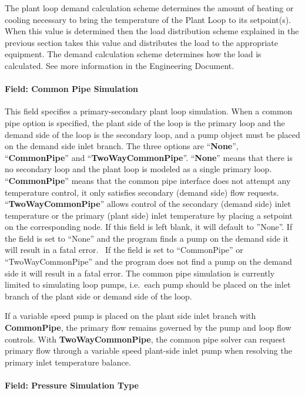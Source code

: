 The plant loop demand calculation scheme determines the amount of heating or cooling necessary to bring the temperature of the Plant Loop to its setpoint(s). When this value is determined then the load distribution scheme explained in the previous section takes this value and distributes the load to the appropriate equipment. The demand calculation scheme determines how the load is calculated. See more information in the Engineering Document.

\paragraph{Field: Common Pipe Simulation}\label{field-common-pipe-simulation}

This field specifies a primary-secondary plant loop simulation. When a common pipe option is specified, the plant side of the loop is the primary loop and the demand side of the loop is the secondary loop, and a pump object must be placed on the demand side inlet branch. The three options are ``\textbf{None}'', ``\textbf{CommonPipe}'' and ``\textbf{TwoWayCommonPipe}''. ``\textbf{None}'' means that there is no secondary loop and the plant loop is modeled as a single primary loop. ``\textbf{CommonPipe}'' means that the common pipe interface does not attempt any temperature control, it only satisfies secondary (demand side) flow requests. ``\textbf{TwoWayCommonPipe}'' allows control of the secondary (demand side) inlet temperature or the primary (plant side) inlet temperature by placing a setpoint on the corresponding node. If this field is left blank, it will default to ''None''. If the field is set to ``None'' and the program finds a pump on the demand side it will result in a fatal error.~ If the field is set to ``CommonPipe'' or ``TwoWayCommonPipe'' and the program does not find a pump on the demand side it will result in a fatal error. The common pipe simulation is currently limited to simulating loop pumps, i.e.~each pump should be placed on the inlet branch of the plant side or demand side of the loop.

If a variable speed pump is placed on the plant side inlet branch with \textbf{CommonPipe}, the primary flow remains governed by the pump and loop flow controls. With \textbf{TwoWayCommonPipe}, the common pipe solver can request primary flow through a variable speed plant-side inlet pump when resolving the primary inlet temperature balance.

\paragraph{Field: Pressure Simulation Type}\label{field-pressure-simulation-type}

